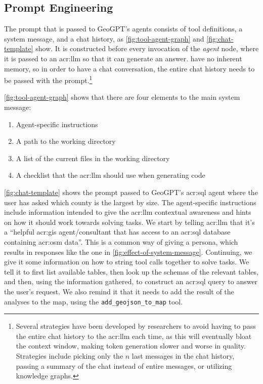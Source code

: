 \subsection{Prompt Engineering}
\label{subsec:prompt-engineering-architecture}

The prompt that is passed to GeoGPT's agents consists of tool definitions, a system message, and a chat history, as \autoref{fig:tool-agent-graph} and \autoref{fig:chat-template} show. It is constructed before every invocation of the \textit{agent} node, where it is passed to an \acrshort{acr:llm} so that it can generate an answer.  have no inherent memory, so in order to have a chat conversation, the entire chat history needs to be passed with the prompt.\footnote{Several strategies have been developed by researchers to avoid having to pass the entire chat history to the \acrshort{acr:llm} each time, as this will eventually bloat the context window, making token generation slower and worse in quality. Strategies include picking only the $n$ last messages in the chat history, passing a summary of the chat instead of entire messages, or utilizing knowledge graphs.}

\autoref{fig:tool-agent-graph} shows that there are four elements to the main system message:

\begin{enumerate}
    \item Agent-specific instructions
    \item A path to the working directory
    \item A list of the current files in the working directory
    \item A checklist that the \acrshort{acr:llm} should use when generating code
\end{enumerate}

\autoref{fig:chat-template} shows the prompt passed to GeoGPT's \acrshort{acr:sql} agent where the user has asked which county is the largest by size. The agent-specific instructions include information intended to give the \acrshort{acr:llm} contextual awareness and hints on how it should work towards solving tasks. We start by telling \acrshort{acr:llm} that it's a \enquote{helpful \acrshort{acr:gis} agent/consultant that has access to an \acrshort{acr:sql} database containing \acrlong{acr:osm} data}. This is a common way of giving  a persona, which results in responses like the one in \autoref{fig:effect-of-system-message}. Continuing, we give it some information on how to string tool calls together to solve tasks. We tell it to first list available tables, then look up the schemas of the relevant tables, and then, using the information gathered, to construct an \acrshort{acr:sql} query to answer the user's request. We also remind it that it needs to add the result of the analyses to the map, using the \texttt{add\_geojson\_to\_map} tool.

